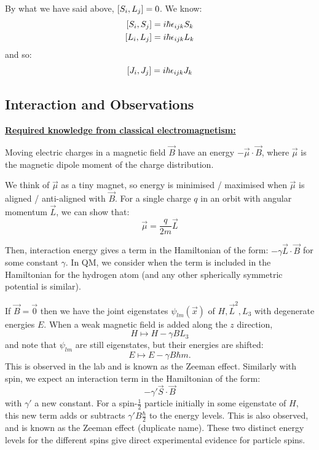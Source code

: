 \documentclass[../Main.tex]{subfiles}
\begin{document}
By what we have said above, $\left[S_i, L_j\right] = 0$. We know:
\begin{align*}
    \left[S_i, S_j\right] &= i\hbar \epsilon_{ijk} S_k \\
    \left[L_i, L_j\right] &= i\hbar \epsilon_{ijk} L_k
\end{align*}
and so:
\begin{equation*}
    \left[J_i, J_j\right] = i\hbar \epsilon_{ijk} J_k
\end{equation*}
\subsection{Interaction and Observations}
\noindent\underline{\textbf{Required knowledge from classical electromagnetism:}}
\begin{leftbartext}
Moving electric charges in a magnetic field $\vec B$ have an energy $- \vec{\mu} \cdot \vec{B}$, where $\vec\mu$ is the magnetic dipole moment of the charge distribution.

We think of $\vec \mu$ as a tiny magnet, so energy is minimised / maximised when $\vec\mu$ is aligned / anti-aligned with $\vec{B}$. For a single charge $q$ in an orbit with angular momentum $\vec L$, we can show that:
\begin{equation*}
    \vec\mu = \frac{q}{2m} \vec L
\end{equation*}
\end{leftbartext}
Then, interaction energy gives a term in the Hamiltonian of the form: $-\gamma \vec{L} \cdot \vec{B}$ for some constant $\gamma$. In QM, we consider when the term is included in the Hamiltonian for the hydrogen atom (and any other spherically symmetric potential is similar).

If $\vec B = \vec0$ then we have the joint eigenstates $\psi_{lm}(\vec x)$ of $H, \vec L^2, L_3$ with degenerate energies $E$. When a weak magnetic field is added along the $z$ direction, 
\begin{equation*}
    H \mapsto H - \gamma B L_3
\end{equation*}
and note that $\psi_{lm}$ are still eigenstates, but their energies are shifted:
\begin{equation*}
    E \mapsto E-\gamma B \hbar m.
\end{equation*}
This is observed in the lab and is known as the Zeeman effect. Similarly with spin, we expect an interaction term in the Hamiltonian of the form:
\begin{equation*}
    -\gamma' \vec{S} \cdot \vec{B}
\end{equation*}
with $\gamma'$ a new constant. For a spin-$\frac12$ particle initially in some eigenstate of $H$, this new term adds or subtracts $\gamma' B \frac\hbar2$ to the energy levels. This is also observed, and is known as the Zeeman effect (duplicate name). These two distinct energy levels for the different spins give direct experimental evidence for particle spins.
\end{document}
